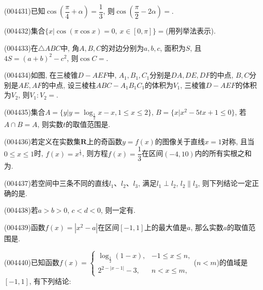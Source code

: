\item (004431)已知$\cos (\dfrac{\pi}4+\alpha)=\dfrac 13$, 则$\cos (\dfrac{\pi}2-2\alpha)=$.
\item (004432)集合$\{x|\cos(\pi \cos x)=0,\ x\in [0,\pi]\}=$(用列举法表示).
\item (004433)在$\triangle ABC$中, 角$A,B,C$的对边分别为$a,b,c$, 面积为$S$, 且$4S=(a+b)^2-c^2$, 则$\cos C=$.
\item (004434)如图, 在三棱锥$D-AEF$中, $A_1,B_1,C_1$分别是$DA,DE,DF$的中点, $B,C$分别是$AE,AF$的中点, 设三棱柱$ABC-A_1B_1C_1$的体积为$V_1$, 三棱锥$D-AEF$的体积为$V_2$, 则$V_1:V_2=$.
\begin{center}
\end{center}
\item (004435)集合$A=\{y|y=\log_{\frac 12}x-x,1\le x\le 2\}$, $B=\{x|x^2-5tx+1\le 0\}$, 若$A\cap B=A$, 则实数$t$的取值范围是.
\item (004436)若定义在实数集$\mathbf{R}$上的奇函数$y=f(x)$的图像关于直线$x=1$对称, 且当$0\le x\le 1$时, $f(x)=x^{\frac 13}$, 则方程$f(x)=\dfrac 13$在区间$(-4,10)$内的所有实根之和为.
\item (004437)若空间中三条不同的直线$l_1$、$l_2$、$l_3$, 满足$l_1\perp l_2$, $l_2\parallel l_3$, 则下列结论一定正确的是.
\item (004438)若$a>b>0$, $c<d<0$, 则一定有.
\item (004439)函数$f(x)=|x^2-a|$在区间$[-1,1]$上的最大值是$a$, 那么实数$a$的取值范围是.
\fourch{$[0,+\infty)$}{$[\dfrac 12,1]$}{$[\dfrac 12,+\infty)$}{$[1,+\infty)$}
\item (004440)已知函数$f(x)=\begin{cases}\log_{\frac 12}(1-x), & -1\le x\le n,  \\ 2^{2-|x-1|}-3, & n<x\le m,  \end{cases}$($n<m$)的值域是$[-1,1]$, 有下列结论:
